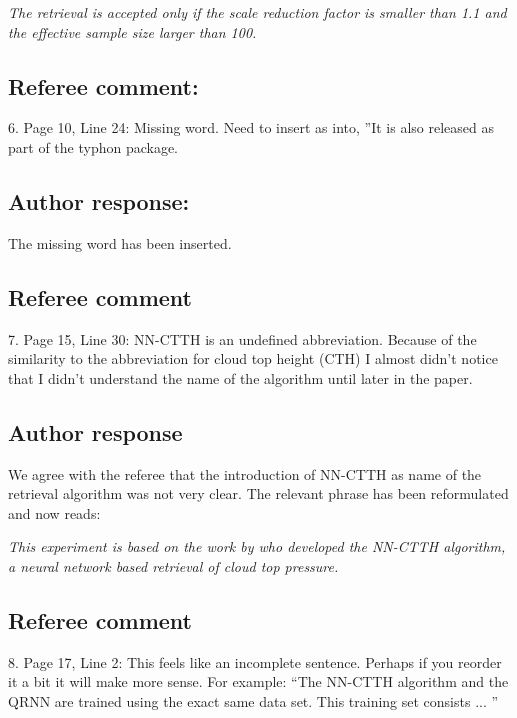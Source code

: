 \documentclass[journal abbreviation, manuscript]{copernicus}
\begin{document}
\vspace{0.5em}
\textit{
  The retrieval is accepted only if the scale reduction factor is smaller than 1.1
  and the effective sample size larger than 100.
}

\subsection*{Referee comment:}

6.  Page 10, Line 24: Missing word.  Need to insert as into, ”It is also released as part
of the typhon package.

\subsection*{Author response:}

The missing word has been inserted.

\subsection*{Referee comment}

7.  Page 15, Line 30:  NN-CTTH is an undefined abbreviation.  Because of the similarity
to the abbreviation for cloud top height (CTH) I almost didn’t notice that I didn’t
understand the name of the algorithm until later in the paper.

\subsection*{Author response}

We agree with the referee that the introduction of NN-CTTH as name of the retrieval
algorithm was not very clear. The relevant phrase has been reformulated and now reads:

\vspace{0.5em}
\textit{
  This experiment is based on the work by \citet{hakansson} who
developed the NN-CTTH algorithm, a neural network based retrieval of cloud top
pressure.}



\subsection*{Referee comment}

8. Page 17, Line 2: This feels like an incomplete sentence. Perhaps if you reorder it a
bit it will make more sense.  For example:  “The NN-CTTH algorithm and the QRNN
are trained using the exact same data set. This training set consists
...
”
\end{document}
